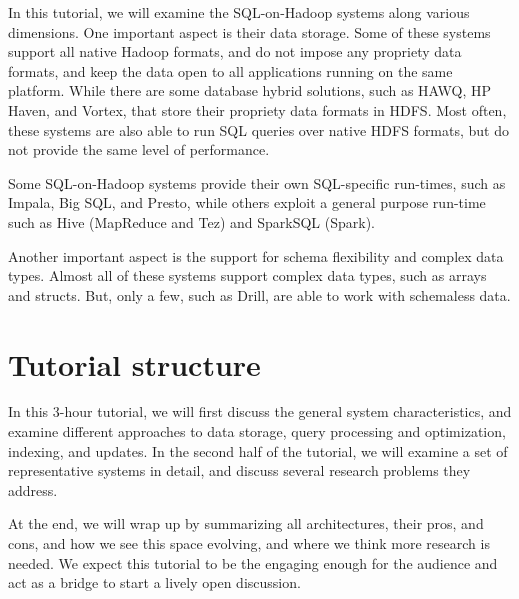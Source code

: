 \documentclass{vldb}
\begin{document}
In this tutorial, we will examine the SQL-on-Hadoop systems along various dimensions. One important aspect is their data storage. Some of these systems support all native Hadoop formats, and do not impose any propriety data formats, and keep the data open to all applications running on the same platform. While there are some database hybrid solutions, such as HAWQ, HP Haven, and Vortex, that store their propriety data formats in HDFS. Most often, these systems are also able to run SQL queries over native HDFS formats, but do not provide the same level of performance.

Some SQL-on-Hadoop systems provide their own SQL-specific run-times, such as Impala, Big SQL, and Presto, while others exploit a general purpose run-time such as Hive (MapReduce and Tez) and SparkSQL (Spark). 

Another important aspect is the support for schema flexibility and complex data types. Almost all of these systems support complex data types, such as arrays and structs. But, only a few, such as Drill, are able to work with schemaless data. 

\section{Tutorial structure}

In this 3-hour tutorial, we will first discuss the general system characteristics, and examine different approaches to data storage, query processing and optimization, indexing, and updates. In the second half of the tutorial, we will examine a set of representative systems in detail, and discuss several research problems they address.
 
At the end, we will wrap up by summarizing all architectures, their pros, and cons, and how we see this space evolving, and where we think more research is needed.
We expect this tutorial to be the engaging enough for the audience and act as a bridge to start a lively open discussion.  
\end{document}
